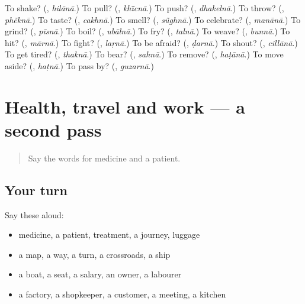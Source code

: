 \begin{tcolorbox}[breakable,colback=teal!4,colframe=teal!35!black,title={Before you move on}]
To shake? (\textbf{}, \emph{hilānā}.) To pull? (\textbf{}, \emph{khī̃cnā}.) To push? (\textbf{}, \emph{dhakelnā}.) To throw? (\textbf{}, \emph{phẽknā}.) To taste? (\textbf{}, \emph{cakhnā}.) To smell? (\textbf{}, \emph{sū̃ghnā}.) To celebrate? (\textbf{}, \emph{manānā}.) To grind? (\textbf{}, \emph{pīsnā}.) To boil? (\textbf{}, \emph{ubālnā}.) To fry? (\textbf{}, \emph{talnā}.) To weave? (\textbf{}, \emph{bunnā}.) To hit? (\textbf{}, \emph{mārnā}.) To fight? (\textbf{}, \emph{laṛnā}.) To be afraid? (\textbf{}, \emph{ḍarnā}.) To shout? (\textbf{}, \emph{cillānā}.) To get tired? (\textbf{}, \emph{thaknā}.) To bear? (\textbf{}, \emph{sahnā}.) To remove? (\textbf{}, \emph{haṭānā}.) To move aside? (\textbf{}, \emph{haṭnā}.) To pass by? (\textbf{}, \emph{guzarnā}.)
\end{tcolorbox}
\section[(dialogue)]{Health, travel and work — a second pass}

\label{lesson:HI-R183-second-pass-health-travel-and-work}



\begin{quote}
Say the words for medicine and a patient.
\end{quote}

\subsection*{Your turn}
Say these aloud:

\begin{itemize}
\raggedright
  \item medicine, a patient, treatment, a journey, luggage
  \item a map, a way, a turn, a crossroads, a ship
  \item a boat, a seat, a salary, an owner, a labourer
  \item a factory, a shopkeeper, a customer, a meeting, a kitchen
\end{itemize}

